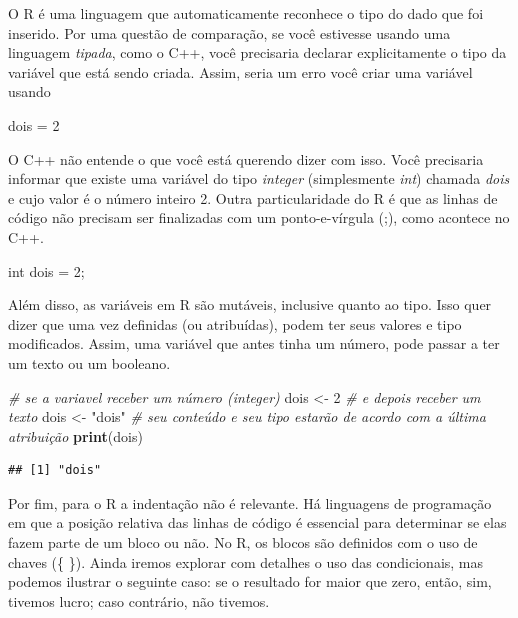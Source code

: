 \documentclass[
]{book}
\newenvironment{Shaded}{\begin{snugshade}}{\end{snugshade}}
\newcommand{\CommentTok}[1]{\textcolor[rgb]{0.56,0.35,0.01}{\textit{#1}}}
\newcommand{\DecValTok}[1]{\textcolor[rgb]{0.00,0.00,0.81}{#1}}
\newcommand{\KeywordTok}[1]{\textcolor[rgb]{0.13,0.29,0.53}{\textbf{#1}}}
\newcommand{\NormalTok}[1]{#1}
\newcommand{\StringTok}[1]{\textcolor[rgb]{0.31,0.60,0.02}{#1}}
\begin{document}
O R é uma linguagem que automaticamente reconhece o tipo do dado que foi inserido. Por uma questão de comparação, se você estivesse usando uma linguagem \emph{tipada}, como o C++, você precisaria declarar explicitamente o tipo da variável que está sendo criada. Assim, seria um erro você criar uma variável usando

\begin{Shaded}
\begin{Highlighting}[]
\NormalTok{dois =}\StringTok{ }\DecValTok{2}
\end{Highlighting}
\end{Shaded}

O C++ não entende o que você está querendo dizer com isso. Você precisaria informar que existe uma variável do tipo \emph{integer} (simplesmente \emph{int}) chamada \emph{dois} e cujo valor é o número inteiro 2. Outra particularidade do R é que as linhas de código não precisam ser finalizadas com um ponto-e-vírgula (;), como acontece no C++.

\begin{Shaded}
\begin{Highlighting}[]
\NormalTok{int dois =}\StringTok{ }\DecValTok{2}\NormalTok{;}
\end{Highlighting}
\end{Shaded}

Além disso, as variáveis em R são mutáveis, inclusive quanto ao tipo. Isso quer dizer que uma vez definidas (ou atribuídas), podem ter seus valores e tipo modificados. Assim, uma variável que antes tinha um número, pode passar a ter um texto ou um booleano.

\begin{Shaded}
\begin{Highlighting}[]
\CommentTok{# se a variavel receber um número (integer)}
\NormalTok{dois <-}\StringTok{ }\DecValTok{2}
\CommentTok{# e depois receber um texto}
\NormalTok{dois <-}\StringTok{ "dois"}
\CommentTok{# seu conteúdo e seu tipo estarão de acordo com a última atribuição}
\KeywordTok{print}\NormalTok{(dois)}
\end{Highlighting}
\end{Shaded}

\begin{verbatim}
## [1] "dois"
\end{verbatim}

Por fim, para o R a indentação não é relevante. Há linguagens de programação em que a posição relativa das linhas de código é essencial para determinar se elas fazem parte de um bloco ou não. No R, os blocos são definidos com o uso de chaves (\{ \}). Ainda iremos explorar com detalhes o uso das condicionais, mas podemos ilustrar o seguinte caso: se o resultado for maior que zero, então, sim, tivemos lucro; caso contrário, não tivemos.
\end{document}
